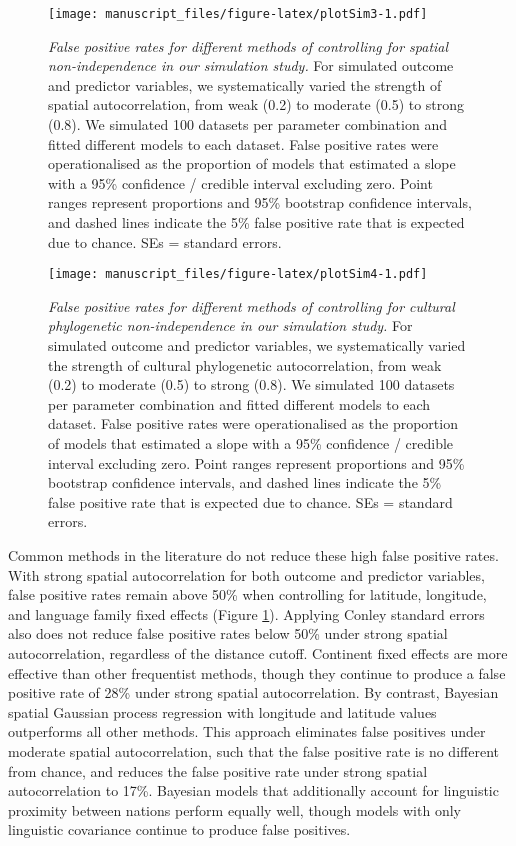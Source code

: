 \documentclass[english,man,floatsintext]{apa6}
\begin{document}
\begin{figure}
\centering
\texttt{[image: manuscript\_files/figure-latex/plotSim3-1.pdf]}
\caption{\label{fig:plotSim3}\emph{False positive rates for different methods of controlling for spatial non-independence in our simulation study.} For simulated outcome and predictor variables, we systematically varied the strength of spatial autocorrelation, from weak (0.2) to moderate (0.5) to strong (0.8). We simulated 100 datasets per parameter combination and fitted different models to each dataset. False positive rates were operationalised as the proportion of models that estimated a slope with a 95\% confidence / credible interval excluding zero. Point ranges represent proportions and 95\% bootstrap confidence intervals, and dashed lines indicate the 5\% false positive rate that is expected due to chance. SEs = standard errors.}
\end{figure}



\begin{figure}
\centering
\texttt{[image: manuscript\_files/figure-latex/plotSim4-1.pdf]}
\caption{\label{fig:plotSim4}\emph{False positive rates for different methods of controlling for cultural phylogenetic non-independence in our simulation study.} For simulated outcome and predictor variables, we systematically varied the strength of cultural phylogenetic autocorrelation, from weak (0.2) to moderate (0.5) to strong (0.8). We simulated 100 datasets per parameter combination and fitted different models to each dataset. False positive rates were operationalised as the proportion of models that estimated a slope with a 95\% confidence / credible interval excluding zero. Point ranges represent proportions and 95\% bootstrap confidence intervals, and dashed lines indicate the 5\% false positive rate that is expected due to chance. SEs = standard errors.}
\end{figure}

Common methods in the literature do not reduce these high false positive rates. With strong spatial autocorrelation for both outcome and predictor variables, false positive rates remain above 50\% when controlling for latitude, longitude, and language family fixed effects (Figure \ref{fig:plotSim3}). Applying Conley standard errors also does not reduce false positive rates below 50\% under strong spatial autocorrelation, regardless of the distance cutoff. Continent fixed effects are more effective than other frequentist methods, though they continue to produce a false positive rate of 28\% under strong spatial autocorrelation. By contrast, Bayesian spatial Gaussian process regression with longitude and latitude values outperforms all other methods. This approach eliminates false positives under moderate spatial autocorrelation, such that the false positive rate is no different from chance, and reduces the false positive rate under strong spatial autocorrelation to 17\%. Bayesian models that additionally account for linguistic proximity between nations perform equally well, though models with only linguistic covariance continue to produce false positives.
\end{document}
